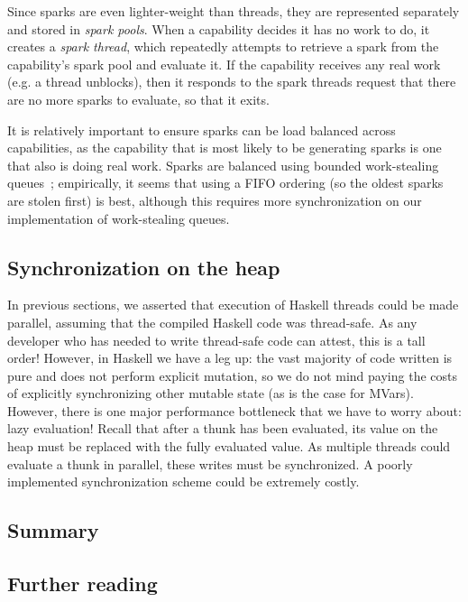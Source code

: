 Since sparks are even lighter-weight than threads, they are represented
separately and stored in \emph{spark pools}.  When a capability decides
it has no work to do, it creates a \emph{spark thread}, which repeatedly
attempts to retrieve a spark from the capability's spark pool and
evaluate it.  If the capability receives any real work (e.g. a thread
unblocks), then it responds to the spark threads request that there are no
more sparks to evaluate, so that it exits.

It is relatively important to ensure sparks can be load balanced across
capabilities, as the capability that is most likely to be generating
sparks is one that also is doing real work.  Sparks are balanced using
bounded work-stealing queues~\XXX; empirically, it seems that using a FIFO
ordering (so the oldest sparks are stolen first) is best, although this
requires more synchronization on our implementation of work-stealing
queues.


\subsection{Synchronization on the heap}

In previous sections, we asserted that execution of Haskell threads
could be made parallel, assuming that the compiled Haskell code was
thread-safe.  As any developer who has needed to write thread-safe code
can attest, this is a tall order!  However, in Haskell we have a leg up:
the vast majority of code written is pure and does not perform explicit
mutation, so we do not mind paying the costs of explicitly synchronizing
other mutable state (as is the case for MVars). However, there is one
major performance bottleneck that we have to worry about: lazy
evaluation!  Recall that after a thunk has been evaluated, its value on
the heap must be replaced with the fully evaluated value.  As multiple
threads could evaluate a thunk in parallel, these writes must be
synchronized. A poorly implemented synchronization scheme could be
extremely costly.


\subsection{Summary}

\subsection{Further reading}
